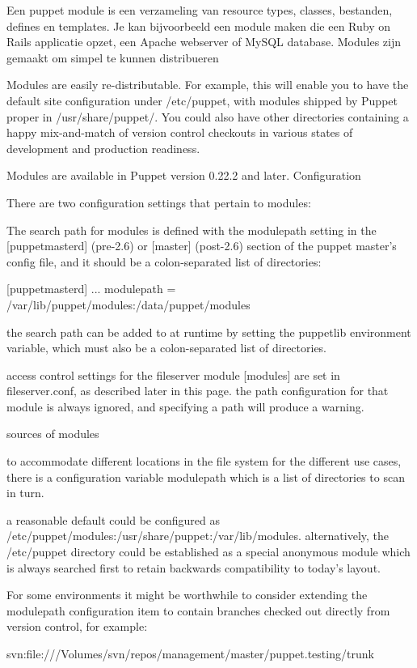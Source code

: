 Een puppet module is een verzameling van resource types, classes, bestanden, defines en templates. Je kan bijvoorbeeld een module maken die een Ruby on Rails applicatie opzet, een Apache webserver of MySQL database. Modules zijn gemaakt om simpel te kunnen distribueren

Modules are easily re-distributable. For example, this will enable you to have the default site configuration under /etc/puppet, with modules shipped by Puppet proper in /usr/share/puppet/. You could also have other directories containing a happy mix-and-match of version control checkouts in various states of development and production readiness.

Modules are available in Puppet version 0.22.2 and later.
Configuration

There are two configuration settings that pertain to modules:

    The search path for modules is defined with the modulepath setting in the [puppetmasterd] (pre-2.6) or [master] (post-2.6) section of the puppet master's config file, and it should be a colon-separated list of directories:

    [puppetmasterd]
    ...
    modulepath = /var/lib/puppet/modules:/data/puppet/modules

    the search path can be added to at runtime by setting the puppetlib environment variable, which must also be a colon-separated list of directories.

    access control settings for the fileserver module [modules] are set in fileserver.conf, as described later in this page. the path configuration for that module is always ignored, and specifying a path will produce a warning.

sources of modules

to accommodate different locations in the file system for the different use cases, there is a configuration variable modulepath which is a list of directories to scan in turn.

a reasonable default could be configured as /etc/puppet/modules:/usr/share/puppet:/var/lib/modules. alternatively, the /etc/puppet directory could be established as a special anonymous module which is always searched first to retain backwards compatibility to today's layout.

For some environments it might be worthwhile to consider extending the modulepath configuration item to contain branches checked out directly from version control, for example:

svn:file:///Volumes/svn/repos/management/master/puppet.testing/trunk

